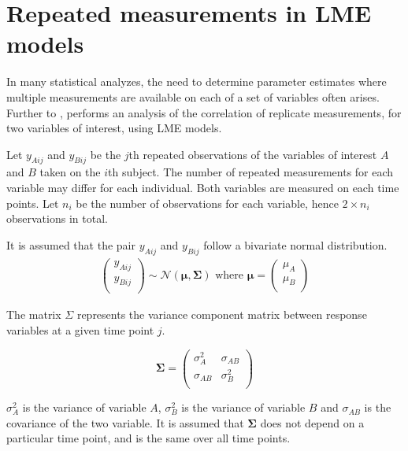 \documentclass[12pt, a4paper]{article}
\begin{document}
\section{Repeated measurements in LME models}

In many statistical analyzes, the need to determine parameter estimates where multiple measurements are available on each of a set of variables often arises. Further to \citet{lam}, \citet{hamlett} performs an analysis of the correlation of replicate measurements, for two variables of interest, using LME models.

Let $y_{Aij}$ and $y_{Bij}$ be the $j$th repeated observations of the variables of interest $A$ and $B$ taken on the $i$th subject. The number of repeated measurements for each variable may differ for each individual.
Both variables are measured on each time points. Let $n_{i}$ be the number of observations for each variable, hence $2\times n_{i}$ observations in total.

It is assumed that the pair $y_{Aij}$ and $y_{Bij}$ follow a bivariate normal distribution.
\begin{eqnarray*}
	\left(
	\begin{array}{c}
		y_{Aij} \\
		y_{Bij} \\
	\end{array}
	\right) \sim \mathcal{N}(
	\boldsymbol{\mu}, \boldsymbol{\Sigma})\mbox{   where } \boldsymbol{\mu} = \left(
	\begin{array}{c}
		\mu_{A} \\
		\mu_{B} \\
	\end{array}
	\right)
\end{eqnarray*}

The matrix $\Sigma$ represents the variance component matrix between response variables at a given time point $j$.

\[
\boldsymbol{\Sigma} = \left( \begin{array}{cc}
\sigma^2_{A} & \sigma_{AB} \\
\sigma_{AB} & \sigma^2_{B}\\
\end{array}   \right)
\]

$\sigma^2_{A}$ is the variance of variable $A$, $\sigma^2_{B}$ is the variance of variable $B$ and $\sigma_{AB}$ is the covariance of the two variable. It is assumed that $\boldsymbol{\Sigma}$ does not depend on a particular time point, and is the same over all time points.



\end{document}
